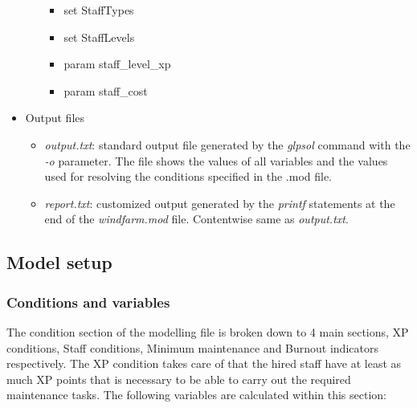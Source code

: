 \begin{itemize}
\begin{itemize}
                \begin{itemize}
                    \item set StaffTypes
                    \item set StaffLevels
                    \item param staff\_level\_xp
                    \item param staff\_cost
                \end{itemize}
            \end{itemize}
        \item Output files
            \begin{itemize}
                \item \textit{output.txt}: standard output file generated by the \textit{glpsol} 
                command with the \textit{-o} parameter. The file shows the values of all variables 
                and the values used for resolving the conditions specified in the .mod file.
                \item \textit{report.txt}: customized output generated by the \textit{printf} 
                statements at the end of the \textit{windfarm.mod} file. Contentwise same as 
                \textit{output.txt}.
            \end{itemize}
    \end{itemize}

    \subsection{Model setup}

        \subsubsection{Conditions and variables}
        The condition section of the modelling file is broken down to 4 main sections, XP conditions,
        Staff conditions, Minimum maintenance and Burnout indicators respectively. The XP condition 
        takes care of that the hired staff have at least as much XP points that is necessary to be able
        to carry out the required maintenance tasks. The following variables are calculated within this
        section: 
        \newpage
        
